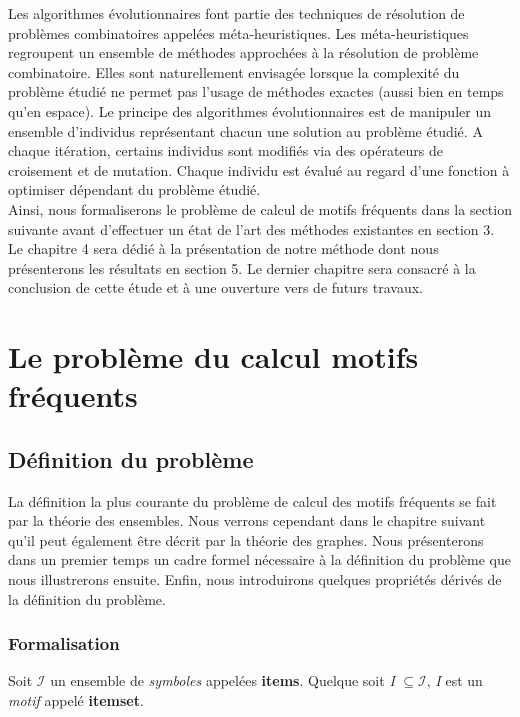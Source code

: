 \documentclass[a4paper,10pt]{report}
\begin{document}
\hspace{0.15cm}Les algorithmes évolutionnaires font partie des techniques de résolution de problèmes combinatoires appelées méta-heuristiques. Les méta-heuristiques regroupent un ensemble de méthodes approchées à la résolution de problème combinatoire. Elles sont naturellement envisagée lorsque la complexité du problème étudié ne permet pas l'usage de méthodes exactes (aussi bien en temps qu'en espace). Le principe des algorithmes évolutionnaires est de manipuler un ensemble d'individus représentant chacun une solution au problème étudié. A chaque itération, certains individus sont modifiés via des opérateurs de croisement et de mutation. Chaque individu est évalué au regard d'une fonction à optimiser dépendant du problème étudié. \\

\hspace{0.15cm}Ainsi, nous formaliserons le problème de calcul de motifs fréquents dans la section suivante avant d'effectuer un état de l'art des méthodes existantes en section 3. Le chapitre 4 sera dédié à la présentation de notre méthode dont nous présenterons les résultats en section 5. Le dernier chapitre sera consacré à la conclusion de cette étude et à une ouverture vers de futurs travaux.

\newpage
\chapter{Le problème du calcul motifs fréquents}

\section{Définition du problème}
	La définition la plus courante du problème de calcul des motifs fréquents se fait par la théorie des ensembles. Nous verrons cependant dans le chapitre suivant qu'il peut également être décrit par la théorie des graphes. Nous présenterons dans un premier temps un cadre formel nécessaire à la définition du problème que nous illustrerons ensuite. Enfin, nous introduirons quelques propriétés dérivés de la définition du problème.

\subsection{Formalisation}
	Soit $\mathcal{I}$ un ensemble de \emph{symboles} appelées \textbf{items}. Quelque soit \emph{I} $ \subseteq \mathcal{I}$, \emph{I} est un \emph{motif} appelé \textbf{itemset}. \\
\end{document}

